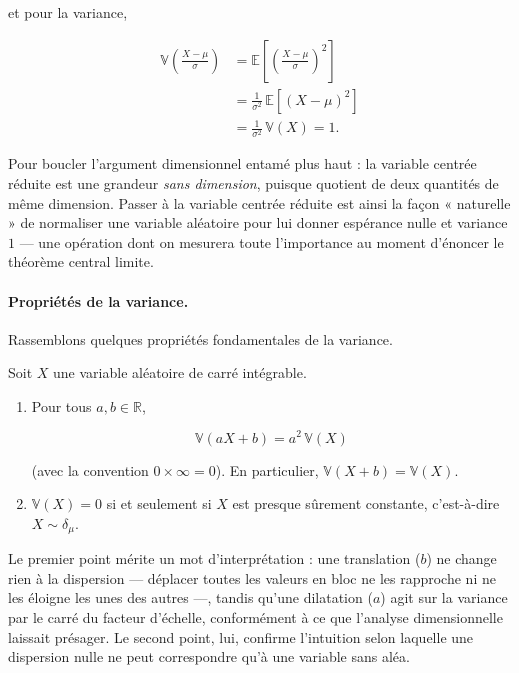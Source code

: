 et pour la variance,

\begin{align*}
\mathbb{V}\!\left( \frac{X - \mu}{\sigma} \right) &= \mathbb{E}\!\left[ \left( \frac{X - \mu}{\sigma} \right)^2 \right] \\
&= \frac{1}{\sigma^2}\, \mathbb{E}[(X - \mu)^2] \\
&= \frac{1}{\sigma^2}\, \mathbb{V}(X) = 1.
\end{align*}

Pour boucler l'argument dimensionnel entamé plus haut : la variable centrée réduite est une grandeur \emph{sans dimension}, puisque quotient de deux quantités de même dimension. Passer à la variable centrée réduite est ainsi la façon « naturelle » de normaliser une variable aléatoire pour lui donner espérance nulle et variance $1$ — une opération dont on mesurera toute l'importance au moment d'énoncer le théorème central limite.

\paragraph{Propriétés de la variance.} Rassemblons quelques propriétés fondamentales de la variance.

\medskip

\begin{mdframed}
\begin{proposition}
Soit $X$ une variable aléatoire de carré intégrable.
\begin{enumerate}
\item Pour tous $a, b \in \mathbb{R}$,

$$
\mathbb{V}(aX + b) = a^2\, \mathbb{V}(X)
$$

(avec la convention $0 \times \infty = 0$). En particulier, $\mathbb{V}(X + b) = \mathbb{V}(X)$.
\item $\mathbb{V}(X) = 0$ si et seulement si $X$ est presque sûrement constante, c'est-à-dire $X \sim \delta_\mu$.
\end{enumerate}
\end{proposition}
\end{mdframed}

Le premier point mérite un mot d'interprétation : une translation ($b$) ne change rien à la dispersion — déplacer toutes les valeurs en bloc ne les rapproche ni ne les éloigne les unes des autres —, tandis qu'une dilatation ($a$) agit sur la variance par le carré du facteur d'échelle, conformément à ce que l'analyse dimensionnelle laissait présager. Le second point, lui, confirme l'intuition selon laquelle une dispersion nulle ne peut correspondre qu'à une variable sans aléa.

